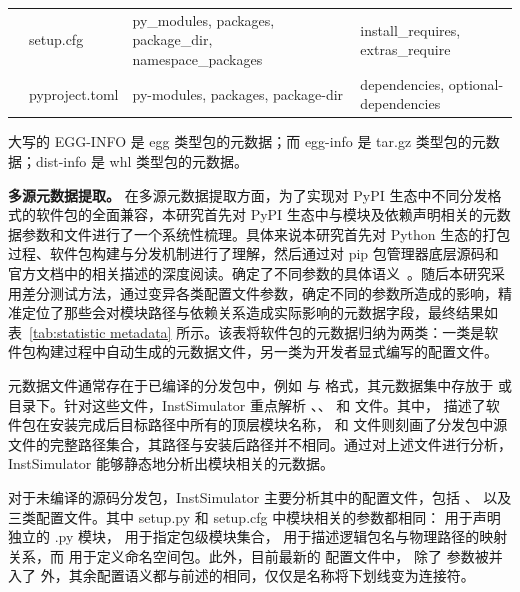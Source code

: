 \begin{table}[thbp]
\begin{threeparttable}
\begin{tabular}{
    >{\centering\arraybackslash}m{2.4cm}
    >{\raggedright\arraybackslash}m{2.6cm}
    >{\raggedright\arraybackslash}m{5.2cm}
    >{\raggedright\arraybackslash}m{4.8cm}
}
& \cellcolor[HTML]{FFFFFF}setup.cfg
& \cellcolor[HTML]{FFFFFF}py\_modules, packages, package\_dir, namespace\_packages
& \cellcolor[HTML]{FFFFFF}install\_requires, extras\_require \\

& \cellcolor[HTML]{EFEFEF}pyproject.toml
& \cellcolor[HTML]{EFEFEF}py-modules, packages, package-dir
& \cellcolor[HTML]{EFEFEF}dependencies, optional-dependencies \\

\hline
\end{tabular}

\begin{tablenotes}
\small
\item[*] 大写的 EGG-INFO 是 egg 类型包的元数据；而 egg-info 是 tar.gz 类型包的元数据；dist-info 是 whl 类型包的元数据。
\end{tablenotes}

\end{threeparttable}
\end{table}

\textbf{多源元数据提取。} 
在多源元数据提取方面，为了实现对 PyPI 生态中不同分发格式的软件包的全面兼容，本研究首先对 PyPI 生态中与模块及依赖声明相关的元数据参数和文件进行了一个系统性梳理。具体来说本研究首先对 Python 生态的打包过程、软件包构建与分发机制进行了理解，然后通过对 pip 包管理器底层源码和官方文档中的相关描述的深度阅读。确定了不同参数的具体语义~\cite{pydocumentation,pip-documentation}。随后本研究采用差分测试方法，通过变异各类配置文件参数，确定不同的参数所造成的影响，精准定位了那些会对模块路径与依赖关系造成实际影响的元数据字段，最终结果如表~\ref{tab:statistic metadata} 所示。该表将软件包的元数据归纳为两类：一类是软件包构建过程中自动生成的元数据文件，另一类为开发者显式编写的配置文件。

元数据文件通常存在于已编译的分发包中，例如  与  格式，其元数据集中存放于  或  目录下。针对这些文件，InstSimulator 重点解析 、、 和  文件。其中， 描述了软件包在安装完成后目标路径中所有的顶层模块名称， 和  文件则刻画了分发包中源文件的完整路径集合，其路径与安装后路径并不相同。通过对上述文件进行分析，InstSimulator 能够静态地分析出模块相关的元数据。

对于未编译的源码分发包，InstSimulator 主要分析其中的配置文件，包括 、 以及  三类配置文件。其中 setup.py 和 setup.cfg 中模块相关的参数都相同： 用于声明独立的 .py 模块， 用于指定包级模块集合， 用于描述逻辑包名与物理路径的映射关系，而  用于定义命名空间包。此外，目前最新的  配置文件中， 除了  参数被并入了  外，其余配置语义都与前述的相同，仅仅是名称将下划线变为连接符。

